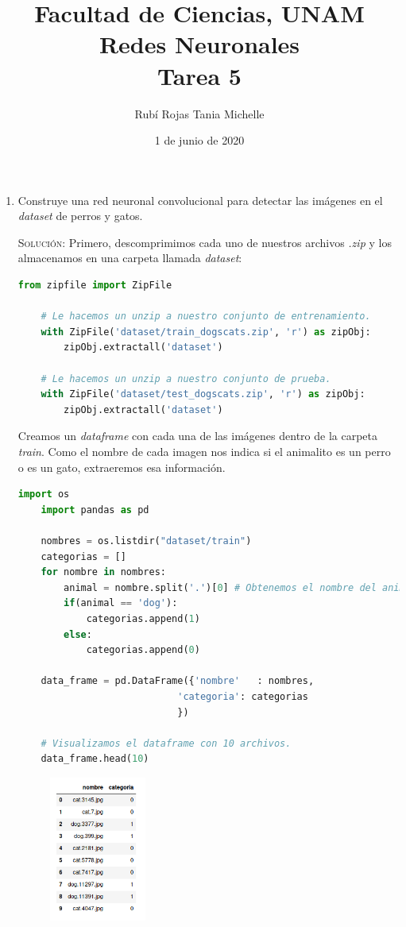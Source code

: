 \documentclass[letterpaper,11pt]{article}
\title{Facultad de Ciencias, UNAM \\ Redes Neuronales \\ Tarea 5}
\author{Rubí Rojas Tania Michelle}
\date{1 de junio de 2020}
\begin{document}
\maketitle

\begin{enumerate}
    \item Construye una red neuronal convolucional para detectar las imágenes
    en el \textit{dataset} de perros y gatos. 

    \textsc{Solución:} Primero, descomprimimos cada uno de nuestros archivos 
    \textit{.zip} y los almacenamos en una carpeta llamada \textit{dataset}:
    \begin{lstlisting}[language=Python]
    from zipfile import ZipFile

    # Le hacemos un unzip a nuestro conjunto de entrenamiento.
    with ZipFile('dataset/train_dogscats.zip', 'r') as zipObj:
        zipObj.extractall('dataset')

    # Le hacemos un unzip a nuestro conjunto de prueba.
    with ZipFile('dataset/test_dogscats.zip', 'r') as zipObj:
        zipObj.extractall('dataset')
    \end{lstlisting}

    Creamos un \textit{dataframe} con cada una de las imágenes dentro de la 
    carpeta \textit{train}. Como el nombre de cada imagen nos indica si el 
    animalito es un perro o es un gato, extraeremos esa información.
    \begin{lstlisting}[language=Python]
    import os
    import pandas as pd

    nombres = os.listdir("dataset/train")
    categorias = []
    for nombre in nombres:
        animal = nombre.split('.')[0] # Obtenemos el nombre del animalito.
        if(animal == 'dog'):
            categorias.append(1)
        else:
            categorias.append(0)
            
    data_frame = pd.DataFrame({'nombre'   : nombres,
                            'categoria': categorias
                            })

    # Visualizamos el dataframe con 10 archivos.
    data_frame.head(10)
    \end{lstlisting}

    \begin{figure}[ht]
        \centering
        \includegraphics[width=0.3\textwidth]{./imagenes/dataframe.png}
    \end{figure} 


\end{enumerate}
\end{document}

